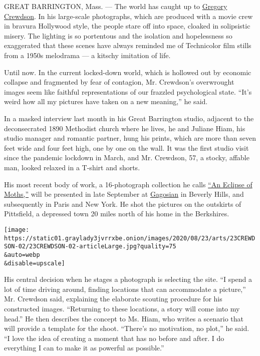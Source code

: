 GREAT BARRINGTON, Mass. --- The world has caught up to
\href{https://gagosian.com/artists/gregory-crewdson/}{Gregory Crewdson}.
In his large-scale photographs, which are produced with a movie crew in
bravura Hollywood style, the people stare off into space, cloaked in
solipsistic misery. The lighting is so portentous and the isolation and
hopelessness so exaggerated that these scenes have always reminded me of
Technicolor film stills from a 1950s melodrama --- a kitschy imitation
of life.

Until now. In the current locked-down world, which is hollowed out by
economic collapse and fragmented by fear of contagion, Mr. Crewdson's
overwrought images seem like faithful representations of our frazzled
psychological state. ``It's weird how all my pictures have taken on a
new meaning,'' he said.

In a masked interview last month in his Great Barrington studio,
adjacent to the deconsecrated 1890 Methodist church where he lives, he
and Juliane Hiam, his studio manager and romantic partner, hung his
prints, which are more than seven feet wide and four feet high, one by
one on the wall. It was the first studio visit since the pandemic
lockdown in March, and Mr. Crewdson, 57, a stocky, affable man, looked
relaxed in a T-shirt and shorts.

His most recent body of work, a 16-photograph collection he calls
\href{https://aperture.org/shop/gregory-crewdson-an-eclipse-of-moths/}{``An
Eclipse of Moths,''} will be presented in late September at
\href{https://gagosian.com/artists/gregory-crewdson/}{Gagosian} in
Beverly Hills, and subsequently in Paris and New York. He shot the
pictures on the outskirts of Pittsfield, a depressed town 20 miles north
of his home in the Berkshires.

\texttt{[image: https://static01.graylady3jvrrxbe.onion/images/2020/08/23/arts/23CREWDSON-02/23CREWDSON-02-articleLarge.jpg?quality=75\\\&auto=webp\\\&disable=upscale]}

His central decision when he stages a photograph is selecting the site.
``I spend a lot of time driving around, finding locations that can
accommodate a picture,'' Mr. Crewdson said, explaining the elaborate
scouting procedure for his constructed images. ``Returning to these
locations, a story will come into my head.'' He then describes the
concept to Ms. Hiam, who writes a scenario that will provide a template
for the shoot. ``There's no motivation, no plot,'' he said. ``I love the
idea of creating a moment that has no before and after. I do everything
I can to make it as powerful as possible.''


